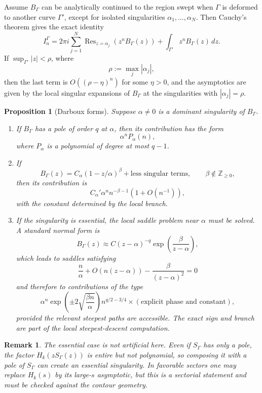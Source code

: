 \documentclass[11pt]{article}
\newtheorem{proposition}[theorem]{Proposition}
\newtheorem{remark}[theorem]{Remark}
\newcommand{\dd}{\,d}
\newcommand{\1}{\mathbf 1}
\begin{document}
Assume \(B_\Gamma\) can be analytically continued to the region swept when \(\Gamma\) is
deformed to another curve \(\Gamma'\), except for isolated singularities
\(\alpha_1,\dots,\alpha_N\). Then Cauchy's theorem gives the exact identity
\begin{equation}\label{eq:darboux-exact}
  I_n^\Gamma
  =
  2\pi i\sum_{j=1}^N \operatorname{Res}_{z=\alpha_j}
  \left(z^nB_\Gamma(z)\right)
  +
  \int_{\Gamma'}z^nB_\Gamma(z)\dd z .
\end{equation}
If \(\sup_{\Gamma'}|z|<\rho\), where
\[
  \rho:=\max_j|\alpha_j|,
\]
then the last term is \(O((\rho-\eta)^n)\) for some \(\eta>0\), and the asymptotics are
given by the local singular expansions of \(B_\Gamma\) at the singularities with
\(|\alpha_j|=\rho\).

\begin{proposition}[Darboux forms]\label{prop:darboux-forms}
Suppose \(\alpha\ne0\) is a dominant singularity of \(B_\Gamma\).
\begin{enumerate}[label=(\roman*)]
\item If \(B_\Gamma\) has a pole of order \(q\) at \(\alpha\), then its contribution has
the form
\[
  \alpha^n P_\alpha(n),
\]
where \(P_\alpha\) is a polynomial of degree at most \(q-1\).
\item If
\[
  B_\Gamma(z)
  =
  C_\alpha (1-z/\alpha)^\beta
  +\text{less singular terms},
  \qquad \beta\notin\mathbb Z_{\ge0},
\]
then its contribution is
\[
  C_\alpha'
  \alpha^n n^{-\beta-1}
  \left(1+O(n^{-1})\right),
\]
with the constant determined by the local branch.
\item If the singularity is essential, the local saddle problem near \(\alpha\) must be
solved. A standard normal form is
\[
  B_\Gamma(z)\approx C(z-\alpha)^{-q}
  \exp\!\left(\frac{\beta}{z-\alpha}\right),
\]
which leads to saddles satisfying
\[
  \frac{n}{\alpha}+O(n(z-\alpha))-\frac{\beta}{(z-\alpha)^2}=0
\]
and therefore to contributions of the type
\[
  \alpha^n
  \exp\!\left(\pm 2\sqrt{\frac{\beta n}{\alpha}}\right)
  n^{q/2-3/4}
  \times(\text{explicit phase and constant}),
\]
provided the relevant steepest paths are accessible. The exact sign and branch are part of
the local steepest-descent computation.
\end{enumerate}
\end{proposition}

\begin{remark}
The essential case is not artificial here. Even if \(S_\Gamma\) has only a pole, the
factor \(H_k(zS_\Gamma(z))\) is entire but not polynomial, so composing it with a pole of
\(S_\Gamma\) can create an essential singularity. In favorable sectors one may replace
\(H_k(s)\) by its large-\(s\) asymptotic, but this is a sectorial statement and must be
checked against the contour geometry.
\end{remark}
\end{document}
